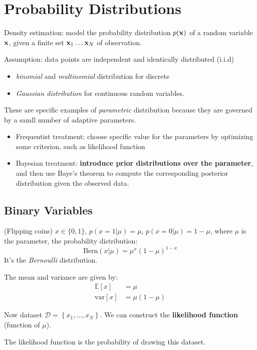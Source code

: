 \chapter{Probability Distributions}
Density estimation: model the probability distribution $p(\mathbf{x})$ of a
random variable $\mathbf{x}$, given a finite set $\mathbf{x}_1 \dots \mathbf{x}_N$ of
observation.

Assumption: data points are independent and identically distributed
(i.i.d)

\begin{itemize}
    \item \emph{binomial} and \emph{multinomial} distribution for discrete
    \item \emph{Gaussian distribution} for continuous random variables.
\end{itemize}

These are specific examples of \emph{parametric} distribution because they
are governed by a samll number of adaptive parameters.

\begin{itemize}
    \item Frequentist treatment: choose specific value for the parameters
        by optimizing some criterion, such as likelihood function
    \item Bayesian treatment: \textbf{introduce prior
        distributions over the parameter}, and then use Baye's theorem to
        compute the corresponding posterior distribution given the
        observed data.
\end{itemize}

\section{Binary Variables}
(Flipping coins) $x \in \{0, 1\}$, $p(x=1|\mu) = \mu$, $p(x=0|\mu) = 1 -
\mu$, where $\mu$ is the parameter, the probability distribution:
\[
    \mbox{Bern}(x|\mu) = \mu^x{(1-\mu)}^{1-x}
\]
It's the \emph{Bernoulli} distribution.

The mean and variance are given by:
\begin{align*}
    \mathbb{E}[x] &= \mu \\
    \mbox{var}[x] &= \mu(1-\mu)
\end{align*}

Now dataset $\mathcal{D} = \left\{ x_1, \dots, x_N \right\}$. We can
construct the \textbf{likelihood function} (function of $\mu$). 

The likelihood function is the probability of drawing this dataset.

